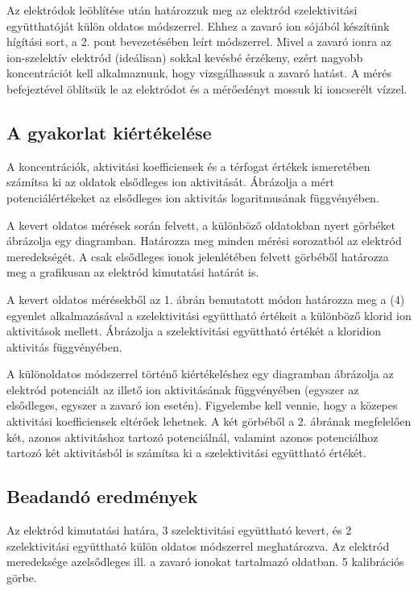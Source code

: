 Az elektródok leöblítése után határozzuk meg az elektród szelektivitási együtthatóját külön oldatos módszerrel.
Ehhez a zavaró ion sójából készítünk hígítási sort, a 2. pont bevezetésében leírt módszerrel.
Mivel a zavaró ionra az ion-szelektív elektród (ideálisan) sokkal kevésbé érzékeny, ezért nagyobb koncentrációt kell alkalmaznunk, hogy vizsgálhassuk a zavaró hatást.
A mérés befejeztével öblítsük le az elektródot és a mérőedényt mossuk ki ioncserélt vízzel.

\subsection{A gyakorlat kiértékelése}

A koncentrációk, aktivitási koefficiensek és a térfogat értékek ismeretében számítsa ki az oldatok elsődleges ion aktivitását.
Ábrázolja a mért potenciálértékeket az elsődleges ion aktivitás logaritmusának függvényében.

A kevert oldatos mérések során felvett, a különböző oldatokban nyert görbéket ábrázolja egy diagramban.
Határozza meg minden mérési sorozatból az elektród meredekségét.
A csak elsődleges ionok jelenlétében felvett görbéből határozza meg a grafikusan az elektród kimutatási határát is.

A kevert oldatos mérésekből az 1. ábrán bemutatott módon határozza meg a (4) egyenlet alkalmazásával a szelektivitási együttható értékeit a különböző klorid ion aktivitások mellett.
Ábrázolja a szelektivitási együttható értékét a kloridion aktivitás függvényében.

A különoldatos módszerrel történő kiértékeléshez egy diagramban ábrázolja az elektród potenciált az illető ion aktivitásának függvényében (egyszer az elsődleges, egyszer a zavaró ion esetén).
Figyelembe kell vennie, hogy a közepes aktivitási koefficiensek eltérőek lehetnek.
A két görbéből a 2. ábrának megfelelően két, azonos aktivitáshoz tartozó potenciálnál, valamint azonos potenciálhoz tartozó két aktivitásból is számítsa ki a szelektivitási együttható értékét.

\subsection{Beadandó eredmények}
Az elektród kimutatási határa, 3 szelektivitási együttható kevert, és 2 szelektivitási együttható külön oldatos módszerrel meghatározva.
Az elektród meredeksége azelsődleges ill. a zavaró ionokat tartalmazó oldatban. 5 kalibrációs görbe.

